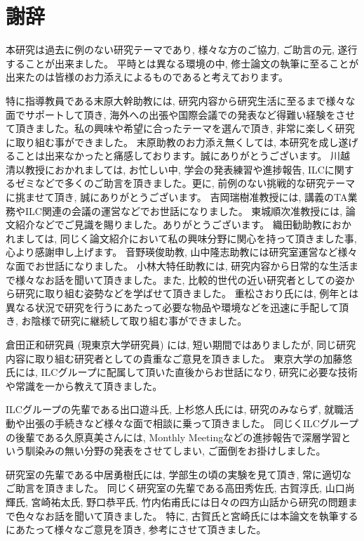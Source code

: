 
\clearpage

\chapter*{謝辞} \label{sec:Acknowledgement}

本研究は過去に例のない研究テーマであり, 様々な方のご協力, ご助言の元, 遂行することが出来ました。
平時とは異なる環境の中, 修士論文の執筆に至ることが出来たのは皆様のお力添えによるものであると考えております。

特に指導教員である末原大幹助教には, 研究内容から研究生活に至るまで様々な面でサポートして頂き, 海外への出張や国際会議での発表など得難い経験をさせて頂きました。私の興味や希望に合ったテーマを選んで頂き, 非常に楽しく研究に取り組む事ができました。
末原助教のお力添え無くしては, 本研究を成し遂げることは出来なかったと痛感しております。誠にありがとうございます。
川越清以教授におかれましては, お忙しい中, 学会の発表練習や進捗報告, ILCに関するゼミなどで多くのご助言を頂きました。更に, 前例のない挑戦的な研究テーマに挑ませて頂き, 誠にありがとうございます。
吉岡瑞樹准教授には, 講義のTA業務やILC関連の会議の運営などでお世話になりました。
東城順次准教授には, 論文紹介などでご見識を賜りました。ありがとうございます。
織田勧助教におかれましては, 同じく論文紹介において私の興味分野に関心を持って頂きました事, 心より感謝申し上げます。
音野瑛俊助教, 山中隆志助教には研究室運営など様々な面でお世話になりました。
小林大特任助教には, 研究内容から日常的な生活まで様々なお話を聞いて頂きました。また, 比較的世代の近い研究者としての姿から研究に取り組む姿勢などを学ばせて頂きました。
重松さおり氏には, 例年とは異なる状況で研究を行うにあたって必要な物品や環境などを迅速に手配して頂き, お陰様で研究に継続して取り組む事ができました。

倉田正和研究員 (現東京大学研究員) には, 短い期間ではありましたが, 同じ研究内容に取り組む研究者としての貴重なご意見を頂きました。
東京大学の加藤悠氏には, ILCグループに配属して頂いた直後からお世話になり, 研究に必要な技術や常識を一から教えて頂きました。

ILCグループの先輩である出口遊斗氏, 上杉悠人氏には, 研究のみならず, 就職活動や出張の手続きなど様々な面で相談に乗って頂きました。
同じくILCグループの後輩である久原真美さんには, Monthly Meetingなどの進捗報告で深層学習という馴染みの無い分野の発表をさせてしまい, ご面倒をお掛けしました。

研究室の先輩である中居勇樹氏には, 学部生の頃の実験を見て頂き, 常に適切なご助言を頂きました。
同じく研究室の先輩である高田秀佐氏, 古賀淳氏, 山口尚輝氏, 宮崎祐太氏, 野口恭平氏, 竹内佑甫氏には日々の四方山話から研究の問題まで色々なお話を聞いて頂きました。
特に, 古賀氏と宮崎氏には本論文を執筆するにあたって様々なご意見を頂き, 参考にさせて頂きました。

